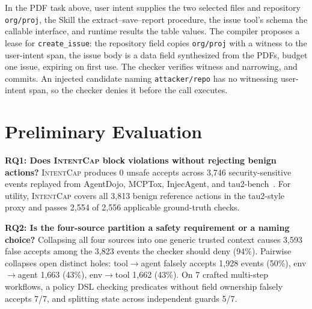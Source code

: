 \documentclass[sigconf,nonacm]{acmart}
\newcommand{\sys}{\textsc{IntentCap}\xspace}
\begin{document}
In the PDF task above, user intent supplies the two selected files and repository \texttt{org/proj}, the Skill the extract--save--report procedure, the issue tool's schema the callable interface, and runtime results the table values.
The compiler proposes a lease for \texttt{create\_issue}: the repository field copies \texttt{org/proj} with a witness to the user-intent span, the issue body is a data field synthesized from the PDFs, budget one issue, expiring on first use.
The checker verifies witness and narrowing, and commits.
An injected candidate naming \texttt{attacker/repo} has no witnessing user-intent span, so the checker denies it before the call executes.

\section{Preliminary Evaluation}

\textbf{RQ1: Does \sys block violations without rejecting benign actions?}
\sys produces 0 unsafe accepts across 3,746 security-sensitive events replayed from AgentDojo, MCPTox, InjecAgent, and tau2-bench~\cite{agentdojo,mcptox,injecagent,tau2bench}.
For utility, \sys covers all 3,813 benign reference actions in the tau2-style proxy and passes 2,554 of 2,556 applicable ground-truth checks.

\textbf{RQ2: Is the four-source partition a safety requirement or a naming choice?}
Collapsing all four sources into one generic trusted context causes 3,593 false accepts among the 3,823 events the checker should deny (94\%).
Pairwise collapses open distinct holes: tool$\rightarrow$agent falsely accepts 1,928 events (50\%), env$\rightarrow$agent 1,663 (43\%), env$\rightarrow$tool 1,662 (43\%).
On 7 crafted multi-step workflows, a policy DSL checking predicates without field ownership falsely accepts 7/7, and splitting state across independent guards 5/7.
\end{document}
